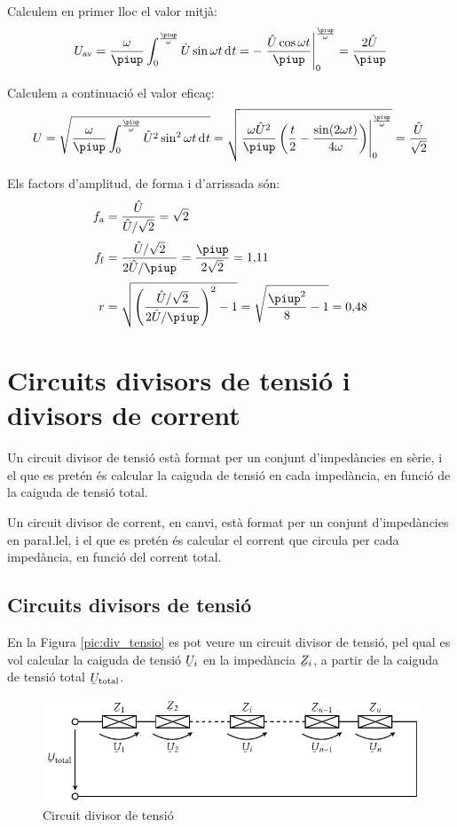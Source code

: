 \begin{exemple}
 Calculem en primer lloc el valor mitj\`{a}:
\[
U\ped{av} = \frac{\omega}{\piup} \int_0^\frac{\piup}{\omega} \hat{U}
\sin\omega t \diff t  = - \left. \frac{\hat{U} \cos\omega t}{\piup}
\right|_0^\frac{\piup}{\omega} = \frac{2 \hat{U}}{\piup}
\]

Calculem a continuaci\'{o} el valor efica\c{c}:
\[
U = \sqrt{\frac{\omega}{\piup} \int_0^\frac{\piup}{\omega} \hat{U}^2
\sin^2\omega t \diff t } =   \sqrt{\left.\frac{\omega
\hat{U}^2}{\piup}\left( \frac{t}{2} - \frac{\sin (2\omega t)}{4\omega}
\right)\right|_0^\frac{\piup}{\omega}}  = \frac{\hat{U}}{\sqrt{2}}
\]

Els factors d'amplitud, de forma i d'arrissada s\'{o}n:
\begin{align*}
    f\ped{a} &= \frac{\hat{U}}{\hat{U}/\sqrt{2}} = \sqrt{2} \\[0.5ex]
    f\ped{f} &= \frac{\hat{U}/\sqrt{2}}{2 \hat{U}/\piup} =\frac{\piup}{2\sqrt{2}} =
    1{,}11 \\[0.5ex]
r &= \sqrt{\left(\frac{\hat{U}/\sqrt{2}}{2 \hat{U}/\piup}\right)^2-1}
= \sqrt{\frac{\piup^2}{8}-1} = 0{,}48
\end{align*}

\end{exemple}


\section{Circuits divisors de tensi\'{o} i divisors de corrent}\label{sec:div_tens_corr}

Un circuit divisor de tensi\'{o} est\`{a} format per un conjunt
d'imped\`{a}ncies en s\`{e}rie, i el que es pret\'{e}n \'{e}s calcular la caiguda de
tensi\'{o} en cada imped\`{a}ncia, en funci\'{o} de la caiguda de tensi\'{o} total.

Un circuit divisor de corrent, en canvi, est\`{a} format per un conjunt
d'imped\`{a}ncies en para{\l.l}el, i el que es pret\'{e}n \'{e}s calcular el
corrent que circula per cada imped\`{a}ncia, en funci\'{o} del corrent
total.

\subsection{Circuits divisors de tensi\'{o}}

En la Figura \vref{pic:div_tensio} es pot veure un circuit divisor
de tensi\'{o}, pel qual es vol calcular la caiguda de tensi\'{o}
$\cmplx{U}_i$ en la imped\`{a}ncia $\cmplx{Z}_i$, a partir de la caiguda
de tensi\'{o} total $\cmplx{U}\ped{total}$.
\begin{figure}[htb]
\centering
    \includegraphics{Imatges/Cap-Fonaments-Divisor-Tensio.pdf}
\caption{Circuit divisor de tensi\'{o}} \label{pic:div_tensio}
\end{figure}

